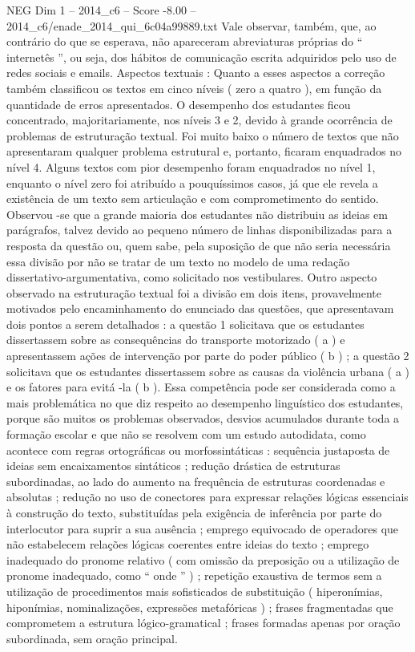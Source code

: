 \begin{textsample}{NEG Dim 1 – 2014\_c6 – Score -8.00 – 2014\_c6/enade\_2014\_qui\_6c04a99889.txt}
Vale observar, também, que, ao contrário do que se esperava, não apareceram abreviaturas próprias do “ internetês ”, ou seja, dos hábitos de comunicação escrita adquiridos pelo uso de redes sociais e emails.
Aspectos textuais : Quanto a esses aspectos a correção também classificou os textos em cinco níveis ( zero a quatro ), em função da quantidade de erros apresentados.
O desempenho dos estudantes ficou concentrado, majoritariamente, nos níveis 3 e 2, devido à grande ocorrência de problemas de estruturação textual.
Foi muito baixo o número de textos que não apresentaram qualquer problema estrutural e, portanto, ficaram enquadrados no nível 4.
Alguns textos com pior desempenho foram enquadrados no nível 1, enquanto o nível zero foi atribuído a pouquíssimos casos, já que ele revela a existência de um texto sem articulação e com comprometimento do sentido.
Observou -se que a grande maioria dos estudantes não distribuiu as ideias em parágrafos, talvez devido ao pequeno número de linhas disponibilizadas para a resposta da questão ou, quem sabe, pela suposição de que não seria necessária essa divisão por não se tratar de um texto no modelo de uma redação dissertativo-argumentativa, como solicitado nos vestibulares.
Outro aspecto observado na estruturação textual foi a divisão em dois itens, provavelmente motivados pelo encaminhamento do enunciado das questões, que apresentavam dois pontos a serem detalhados : a questão 1 solicitava que os estudantes dissertassem sobre as consequências do transporte motorizado ( a ) e apresentassem ações de intervenção por parte do poder público ( b ) ; a questão 2 solicitava que os estudantes dissertassem sobre as causas da violência urbana ( a ) e os fatores para evitá -la ( b ).
Essa competência pode ser considerada como a mais problemática no que diz respeito ao desempenho linguístico dos estudantes, porque são muitos os problemas observados, desvios acumulados durante toda a formação escolar e que não se resolvem com um estudo autodidata, como acontece com regras ortográficas ou morfossintáticas : sequência justaposta de ideias sem encaixamentos sintáticos ; redução drástica de estruturas subordinadas, ao lado do aumento na frequência de estruturas coordenadas e absolutas ; redução no uso de conectores para expressar relações lógicas essenciais à construção do texto, substituídas pela exigência de inferência por parte do interlocutor para suprir a sua ausência ; emprego equivocado de operadores que não estabelecem relações lógicas coerentes entre ideias do texto ; emprego inadequado do pronome relativo ( com omissão da preposição ou a utilização de pronome inadequado, como “ onde ” ) ; repetição exaustiva de termos sem a utilização de procedimentos mais sofisticados de substituição ( hiperonímias, hiponímias, nominalizações, expressões metafóricas ) ; frases fragmentadas que comprometem a estrutura lógico-gramatical ; frases formadas apenas por oração subordinada, sem oração principal.

\end{textsample}
